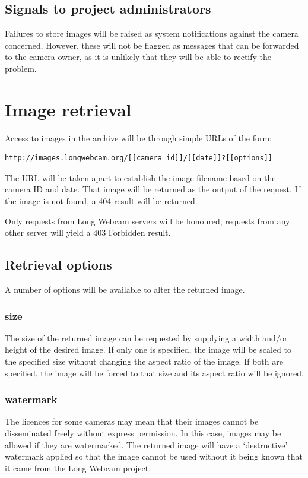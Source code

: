\documentclass[11pt]{article}
\begin{document}
\subsection{Signals to project administrators}
Failures to store images will be raised as system notifications against the camera concerned. However, these will not be flagged as messages that can be forwarded to the camera owner, as it is unlikely that they will be able to rectify the problem.

\section{Image retrieval}
Access to images in the archive will be through simple URLs of the form:

\begin{verbatim}
http://images.longwebcam.org/[[camera_id]]/[[date]]?[[options]]
\end{verbatim}

The URL will be taken apart to establish the image filename based on the camera ID and date. That image will be returned as the output of the request. If the image is not found, a 404 result will be returned.

Only requests from Long Webcam servers will be honoured; requests from any other server will yield a 403 Forbidden result.

\subsection{Retrieval options}
A number of options will be available to alter the returned image.

\subsubsection{size}
The size of the returned image can be requested by supplying a width and/or height of the desired image. If only one is specified, the image will be scaled to the specified size without changing the aspect ratio of the image. If both are specified, the image will be forced to that size and its aspect ratio will be ignored.

\subsubsection{watermark}
The licences for some cameras may mean that their images cannot be disseminated freely without express permission. In this case, images may be allowed if they are watermarked. The returned image will have a `destructive' watermark applied so that the image cannot be used without it being known that it came from the Long Webcam project.
\end{document}
